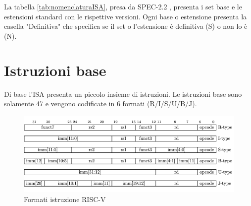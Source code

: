 \documentclass[12pt, a4paper]{report}
\begin{document}
La tabella \ref{tab:nomenclaturaISA}, presa da SPEC-2.2 \cite{ISA}, presenta i set base e le estensioni standard con le rispettive versioni. Ogni base o estensione presenta la casella "Definitiva" che specifica se il set o l'estensione è definitiva (S) o non lo è (N).


\section{Istruzioni base}
Di base l'ISA presenta un piccolo insieme di istruzioni. Le istruzioni base sono solamente 47 e vengono codificate in 6 formati (R/I/S/U/B/J). 

\begin{figure}[!ht]
	\includegraphics[width = \textwidth]{FormatiIstruzione.png}
	\caption{Formati istruzione RISC-V\cite{ISA}}
	\label{Fig:Formati_istruzioni_RV32I}
	
\end{figure}
\end{document}
